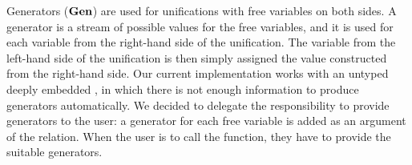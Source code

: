 Generators ($\operatorname{\mathbf{Gen}}$) are used for unifications with free variables on both sides.
A generator is a stream of possible values for the free variables, and it is used for each variable from the right-hand side of the unification.
The variable from the left-hand side of the unification is then simply assigned the value constructed from the right-hand side.
Our current implementation works with an untyped deeply embedded \mk, in which there is not enough information to produce generators automatically.
We decided to delegate the responsibility to provide generators to the user: a generator for each free variable is added as an argument of the relation.
When the user is to call the function, they have to provide the suitable generators.

